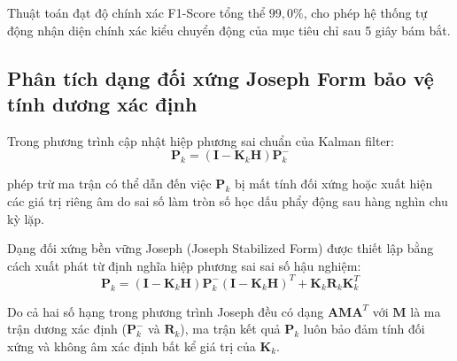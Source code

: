 Thuật toán đạt độ chính xác F1-Score tổng thể $99{,}0\%$, cho phép hệ thống tự động nhận diện chính xác kiểu chuyển động của mục tiêu chỉ sau 5 giây bám bắt.

\subsection{Phân tích dạng đối xứng Joseph Form bảo vệ tính dương xác định}

\hspace{0.5cm} Trong phương trình cập nhật hiệp phương sai chuẩn của Kalman filter:
\begin{equation}
\mathbf{P}_k = (\mathbf{I} - \mathbf{K}_k \mathbf{H}) \mathbf{P}_k^-
\label{eq:standard-p-update}
\end{equation}

phép trừ ma trận có thể dẫn đến việc $\mathbf{P}_k$ bị mất tính đối xứng hoặc xuất hiện các giá trị riêng âm do sai số làm tròn số học dấu phẩy động sau hàng nghìn chu kỳ lặp.

Dạng đối xứng bền vững Joseph (Joseph Stabilized Form) được thiết lập bằng cách xuất phát từ định nghĩa hiệp phương sai sai số hậu nghiệm:
\begin{equation}
\mathbf{P}_k = (\mathbf{I} - \mathbf{K}_k \mathbf{H}) \mathbf{P}_k^- (\mathbf{I} - \mathbf{K}_k \mathbf{H})^T + \mathbf{K}_k \mathbf{R}_k \mathbf{K}_k^T
\label{eq:joseph-stabilized-form}
\end{equation}

Do cả hai số hạng trong phương trình Joseph đều có dạng $\mathbf{A} \mathbf{M} \mathbf{A}^T$ với $\mathbf{M}$ là ma trận dương xác định ($\mathbf{P}_k^-$ và $\mathbf{R}_k$), ma trận kết quả $\mathbf{P}_k$ luôn bảo đảm tính đối xứng và không âm xác định bất kể giá trị của $\mathbf{K}_k$.

\begin{table}[H]
\centering
\caption{So sánh độ ổn định số học và thời gian tính toán giữa công thức chuẩn và dạng Joseph}
\label{tab:joseph-vs-standard-comparison}
\end{table}

